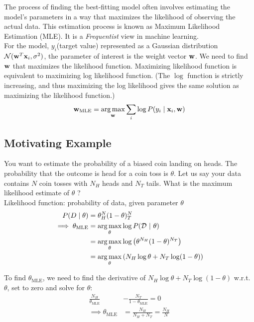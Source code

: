 The process of finding the best-fitting model often involves estimating the model's parameters in a way that maximizes the likelihood of observing the actual data. This estimation process is known as Maximum Likelihood Estimation (MLE). It is a \textit{Frequentist} view in machine learning. \\

For the model, $y_i$(target value) represented as a Gaussian distribution $\mathcal{N}(\mathbf{w}^T\mathbf{x}_i, \sigma^2)$, the parameter of interest is the weight vector $\mathbf{w}$. We need to find $\mathbf{w}$ that maximizes the likelihood function. Maximizing likelihood function is equivalent to maximizing log likelihood function. (The $\log$ function is strictly increasing, and thus maximizing the log likelihood gives the same solution as maximizing the likelihood function.)
$$
  \mathbf{w}_{\text{MLE}} = \operatorname*{arg\,max}_{\mathbf{w}} \underset{i}\sum \log P(y_i \mid \mathbf{x}_i, \mathbf{w})
$$

\subsection{Motivating Example}
You want to estimate the probability of a biased coin landing on heads. The probability that the outcome is head for a coin toss is $\theta$.  Let us say your data contains $N$ coin tosses with $N_H$ heads and $N_T$ tails. What is the maximum likelihood estimate of $\theta$ ?\\

Likelihood function: probability of data, given parameter $\theta$
\begin{align*}
  P(D\mid\theta)               & = \theta^N_H(1-\theta)^N_T                                              \\
  \implies \theta_{\text{MLE}} & = \operatorname*{arg\,max}_{\theta} \log P(\mathcal{D} \ | \  \theta)                              \\
                               & = \operatorname*{arg\,max}_{\theta} \log \left( \theta^{N_H} (1-\theta)^{N_T} \right)    \\
                               & = \operatorname*{arg\,max}_{\theta} \left( N_H \log \theta + N_T \log (1-\theta) \right)
\end{align*}

To find $\theta_{\text{MLE}}$, we need to find the derivative of $N_H \log \theta + N_T \log (1-\theta)$ w.r.t. $\theta$, set to zero and solve for $\theta$:
\begin{align*}
  \frac{N_H}{\theta_{\text{MLE}}} & - \frac{N_T}{1-\theta_{\text{MLE}}} = 0 \\
  \implies \theta_{\text{MLE}}    & =\frac{N_H}{N_H+N_T}=\frac{N_H}{N}
\end{align*}

